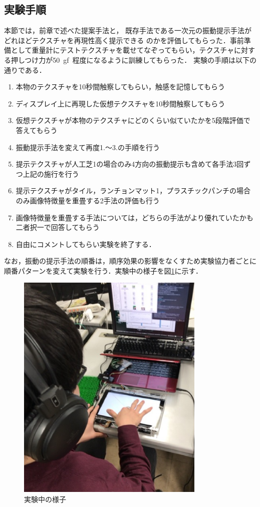 \subsection{実験手順}
本節では，前章で述べた提案手法と，
既存手法である一次元の振動提示手法がどれほどテクスチャを再現性高く提示できる
のかを評価してもらった．事前準備として重量計にテストテクスチャを載せてなぞってもらい，テクスチャに対する押しつけ力が50\ gf\ 程度になるように訓練してもらった．
実験の手順は以下の通りである．
\begin{enumerate}
  \item 本物のテクスチャを10秒間触察してもらい，触感を記憶してもらう
  \item ディスプレイ上に再現した仮想テクスチャを10秒間触察してもらう
  \item 仮想テクスチャが本物のテクスチャにどのくらい似ていたかを5段階評価で答えてもらう
  \item 振動提示手法を変えて再度1.～3.の手順を行う
  \item 提示テクスチャが人工芝1の場合のみ4方向の振動提示も含めて各手法3回ずつ上記の施行を行う
  \item 提示テクスチャがタイル，ランチョンマット1，プラスチックパンチの場合のみ画像特徴量を重畳する2手法の評価も行う
  \item 画像特徴量を重畳する手法については，どちらの手法がより優れていたかも二者択一で回答してもらう
  \item 自由にコメントしてもらい実験を終了する．
\end{enumerate}

なお，振動の提示手法の順番は，順序効果の影響をなくすため実験協力者ごとに
順番パターンを変えて実験を行う．実験中の様子を図\ref{5-7}に示す．

\begin{figure}[h]
\begin{center}
  \includegraphics[width=9cm]{zikken.eps}
  \caption{実験中の様子}
  \label{5-7}
\end{center}
\end{figure}

